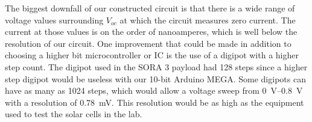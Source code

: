 The biggest downfall of our constructed circuit is that there is a wide range of voltage values surrounding $V_{oc}$ at which the circuit measures zero current.
The current at those values is on the order of nanoamperes, which is well below the resolution of our circuit.
One improvement that could be made in addition to choosing a higher bit microcontroller or IC is the use of a digipot with a higher step count.
The digipot used in the SORA 3 payload had 128 steps since a higher step digipot would be useless with our 10-bit Arduino MEGA.
Some digipots can have as many as 1024 steps, which would allow a voltage sweep from \SIrange{0}{0.8}{\volt} with a resolution of \SI{0.78}{\milli\volt}.
This resolution would be as high as the equipment used to test the solar cells in the lab.
